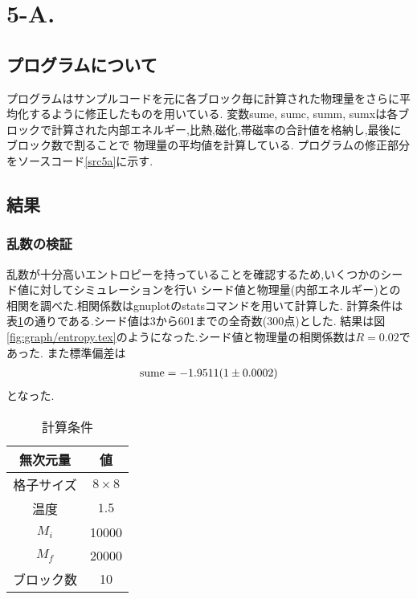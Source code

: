 \section{5-A.}
\subsection{プログラムについて}
プログラムはサンプルコードを元に各ブロック毎に計算された物理量をさらに平均化するように修正したものを用いている.
変数sume, sumc, summ, sumxは各ブロックで計算された内部エネルギー,比熱,磁化,帯磁率の合計値を格納し,最後にブロック数で割ることで
物理量の平均値を計算している.
プログラムの修正部分をソースコード\ref{src5a}に示す.
\subsection{結果}
\subsubsection{乱数の検証}
乱数が十分高いエントロピーを持っていることを確認するため,いくつかのシード値に対してシミュレーションを行い
シード値と物理量(内部エネルギー)との相関を調べた.相関係数はgnuplotのstatsコマンドを用いて計算した.
計算条件は表\ref{tab:5a1}の通りである.シード値は3から601までの全奇数(300点)とした.
結果は図\ref{fig:graph/entropy.tex}のようになった.シード値と物理量の相関係数は$R=0.02$であった.
また標準偏差は
\begin{align}
  {\rm sume}=-1.9511(1\pm0.0002)
\end{align}
となった.
\begin{table}[h]
  \caption{計算条件}
  \label{tab:5a1}
  \centering
  \begin{tabular}{cc}
    \hline
    無次元量&値\\
    \hline \hline
    格子サイズ&$8\times 8$\\
    温度&$1.5$\\
    $M_i$&10000\\
    $M_f$&20000\\
    ブロック数&10\\
    \hline
  \end{tabular}
\end{table}
\clearpage
